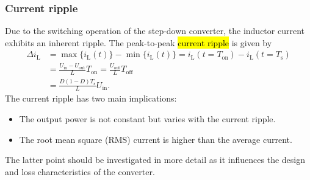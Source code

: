 \begin{frame}
    \frametitle{Current ripple}
    Due to the switching operation of the step-down converter, the inductor current exhibits an inherent ripple. The peak-to-peak \hl{current ripple} is given by
    \begin{equation}
        \begin{split}
            \Delta i_\mathrm{L} &= \max\{i_\mathrm{L}(t)\} - \min\{i_\mathrm{L}(t)\}  = i_\mathrm{L}(t=T_\mathrm{on}) - i_\mathrm{L}(t=T_\mathrm{s})\\
                                &=\frac{U_\mathrm{in} - U_\mathrm{out}}{L} T_\mathrm{on} = \frac{U_\mathrm{out}}{L} T_\mathrm{off}\\
                                & = \frac{D(1-D)T_\mathrm{s}}{L}U_\mathrm{in}.
        \end{split}
        \label{eq:current-ripple-simple-step-down}
    \end{equation}
    The current ripple has two main implications:
    \begin{itemize}
        \item The output power is not constant but varies with the current ripple.
        \item The root mean square (RMS) current is higher than the average current.
    \end{itemize}
    The latter point should be investigated in more detail as it influences the design and loss characteristics of the converter.
\end{frame}

